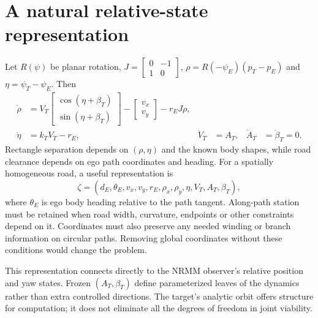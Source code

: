 \documentclass[11pt]{article}
\begin{document}
\section{A natural relative-state representation}
Let $R(\psi)$ be planar rotation,
$J=\left[\begin{smallmatrix}0&-1\\1&0\end{smallmatrix}\right]$,
$\rho=R(-\psi_E)(p_T-p_E)$ and $\eta=\psi_T-\psi_E$.
Then
\begin{align}
\dot\rho&=V_T\begin{bmatrix}\cos(\eta+\beta_T)\\\sin(\eta+\beta_T)\end{bmatrix}
       -\begin{bmatrix}v_x\\v_y\end{bmatrix}-r_EJ\rho,\label{eq:relative}\\
\dot\eta&=k_TV_T-r_E, & \dot V_T&=A_T, &
\dot A_T&=\dot\beta_T=0.\nonumber
\end{align}
Rectangle separation depends on $(\rho,\eta)$ and the known body shapes,
while road clearance depends on ego path coordinates and heading. For a
spatially homogeneous road, a useful representation is
\begin{equation}
\zeta=(d_E,\theta_E,v_x,v_y,r_E,\rho_x,\rho_y,\eta,V_T,A_T,\beta_T),
\end{equation}
where $\theta_E$ is ego body heading relative to the path tangent.
Along-path station must be retained when road width, curvature, endpoints
or other constraints depend on it. Coordinates must also preserve any
needed winding or branch information on circular paths. Removing global
coordinates without these conditions would change the problem.

This representation connects directly to the NRMM observer's relative
position and yaw states. Frozen $(A_T,\beta_T)$ define parameterized
leaves of the dynamics rather than extra controlled directions. The
target's analytic orbit offers structure for computation; it does not
eliminate all the degrees of freedom in joint viability.
\end{document}
